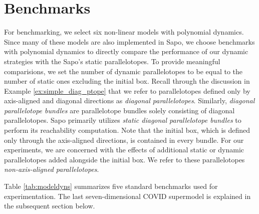 \section{Benchmarks}
\label{sec:benchmarks}
For benchmarking, we select six non-linear models with polynomial dynamics.
%
Since many of these models are also implemented in Sapo, we choose benchmarks with polynomial dynamics to directly compare the performance of our dynamic strategies with the Sapo's static parallelotopes. To provide meaningful comparisions, we set the number of dynamic parallelotopes to be equal to the number of static ones excluding the initial box.
%
Recall through the discussion in Example \ref{ex:simple_diag_ptope} that we refer to parallelotopes defined only by axis-aligned and diagonal directions as \emph{diagonal parallelotopes}.
%
Similarly, \emph{diagonal parallelotope bundles} are parallelotope bundles solely consisting of diagonal parallelotopes. Sapo primarily utilizes \emph{static diagonal parallelotope bundles} to perform its reachability computation.
%
Note that the initial box, which is defined only through the axis-aligned directions, is contained in every bundle.
%
For our experiments, we are concerned with the effects of additional static or dynamic parallelotopes added alongside the initial box. We refer to these parallelotopes \emph{non-axis-aligned parallelotopes}.

Table \ref{tab:modeldyns} summarizes five standard benchmarks used for experimentation. The last seven-dimensional COVID supermodel is explained in the subsequent section below.




\def \voltablespace {-0.8cm}

